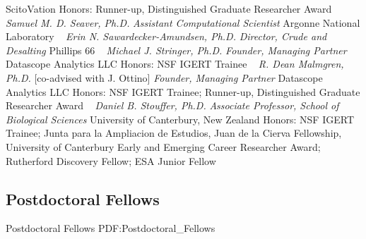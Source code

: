     ScitoVation
    \newline
    {\footnotesize Honors: Runner-up, Distinguished Graduate Researcher Award}
    \newline
~
\Gap{}
\textit{Samuel M. D. Seaver, Ph.D.}
\newline
    \textit{Assistant Computational Scientist}
    \newline
    Argonne National Laboratory
    \newline
~
\Gap{}
\textit{Erin N. Sawardecker-Amundsen, Ph.D.}
\newline
    \textit{Director, Crude and Desalting}
    \newline
    Phillips 66
    \newline
~
\Gap{}
\textit{Michael J. Stringer, Ph.D.}
\newline
    \textit{Founder, Managing Partner}
    \newline
    Datascope Analytics LLC
    \newline
    {\footnotesize Honors: NSF IGERT Trainee}
    \newline
~
\Gap{}
\textit{R. Dean Malmgren, Ph.D.}
    [co-advised with J. Ottino]
\newline
    \textit{Founder, Managing Partner}
    \newline
    Datascope Analytics LLC
    \newline
    {\footnotesize Honors: NSF IGERT Trainee; Runner-up, Distinguished Graduate Researcher Award}
    \newline
~
\Gap{}
\textit{Daniel B. Stouffer, Ph.D.}
\newline
    \textit{Associate Professor, School of Biological Sciences}
    \newline
    University of Canterbury, New Zealand
    \newline
    {\footnotesize Honors: NSF IGERT Trainee; Junta para la Ampliacion de Estudios, Juan de la Cierva Fellowship, University of Canterbury Early and Emerging Career Researcher Award; Rutherford Discovery Fellow; ESA Junior Fellow}
    \newline
~
\Gap\vspace*{0.2cm}\subsection
{Postdoctoral Fellows}
{Postdoctoral Fellows}
{PDF:Postdoctoral_Fellows}

